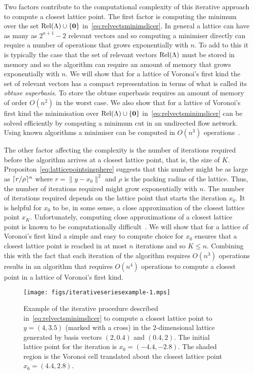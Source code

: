 \documentclass[final,leqno]{siamltex}
\begin{document}
Two factors contribute to the computational complexity of this iterative approach to compute a closest lattice point.  The first factor is computing the minimum over the set $\operatorname{Rel}(\Lambda) \cup \{\boldsymbol{0}\}$ in~\eqref{eq:relvectsminimslicer}.  In general a lattice can have as many as $2^{n+1}-2$ relevant vectors and so computing a minimiser directly can require a number of operations that grows exponentially with $n$.  To add to this it is typically the case that the set of relevant vectors $\operatorname{Rel}(\Lambda)$ must be stored in memory and so the algorithm can require an amount of memory that grows exponentially with $n$.  We will show that for a lattice of Voronoi's first kind the set of relevant vectors has a compact representation in terms of what is called its \emph{obtuse superbasis}.  To store the obtuse superbasis requires an amount of memory of order $O(n^2)$ in the worst case.  We also show that for a lattice of Voronoi's first kind the minimisation over $\operatorname{Rel}(\Lambda) \cup \{\boldsymbol{0}\}$ in~\eqref{eq:relvectsminimslicer} can be solved efficiently by computing a minimum cut in an undirected flow network.  Using known algorithms a minimiser can be computed in $O(n^3)$ operations~\cite{Goldberg:1986:NAM:12130.12144,EdmondsKarp_max_flow,Cormen2001}. 

The other factor affecting the complexity is the number of iterations required before the algorithm arrives at a closest lattice point, that is, the size of $K$.  Propositon~\ref{eq:latticepointsinsphere} suggests that this number might be as large as $\lceil r/\rho \rceil^n$ where $r = \|y - x_0\|^2$ and $\rho$ is the packing radius of the lattice.  Thus, the number of iterations required might grow exponentially with $n$.  The number of iterations required depends on the lattice point that starts the iteration $x_0$.  It is helpful for $x_0$ to be, in some sense, a close approximation of the closest lattice point $x_K$.  Unfortunately, computing close approximations of a closest lattice point is known to be computationally difficult~\cite{feige_inapproximability_2004}.  We will show that for a lattice of Voronoi's first kind a simple and easy to compute choice for $x_0$ ensures that a closest lattice point is reached in at most $n$ iterations and so $K \leq n$.  Combining this with the fact that each iteration of the algorithm requires $O(n^3)$ operations results in an algorithm that requires $O(n^4)$ operations to compute a closest point in a lattice of Voronoi's first kind. 


\begin{figure}[tp] 
	\centering      
		\texttt{[image: figs/iterativeseriesexample-1.mps]} 
		\caption{Example of the iterative procedure described in~\eqref{eq:relvectsminimslicer} to compute a closest lattice point to $y = (4,3.5)$ (marked with a cross) in the $2$-dimensional lattice generated by basis vectors $(2,0.4)$ and $(0.4,2)$.  The initial lattice point for the iteration is $x_0 = (-4.4,-2.8)$.  The shaded region is the Voronoi cell translated about the closest lattice point $x_6 = (4.4,2.8)$.}       
		\label{lattices:fig:iterativeexample} 
\end{figure} 
\end{document}
